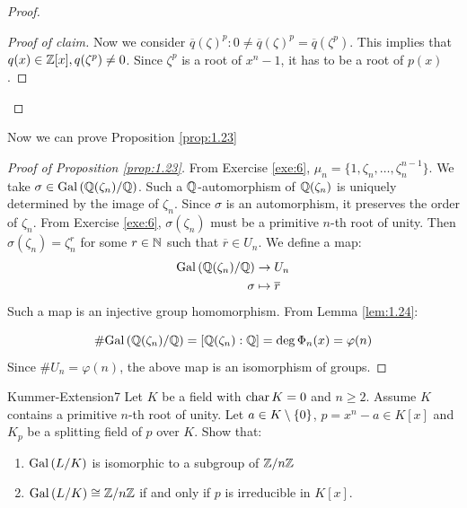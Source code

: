 \documentclass[twoside = false,	%
		headsepline,		%
		parskip = true,
		]{scrbook}						%
\begin{document}
\begin{proof}
\begin{proof}[Proof of claim]
                Now we consider $\overline{q}(\zeta)^p: 0 \neq \overline{q}(\zeta)^p = \overline{q}(\zeta^p)$. This implies that $q(x) \in \mathbb Z[x], q(\zeta^p) \neq 0$. Since $\zeta^p$ is a root of $x^n - 1$, it has to be a root of $p(x)$.
            \end{proof}
        \end{proof}
        
        Now we can prove Proposition \ref{prop:1.23}
        
        \begin{proof}[Proof of Proposition \ref{prop:1.23}]
            
            From Exercise \ref{exe:6}, $\mu_n = \{1,\zeta_n,\dots,\zeta_n^{n-1}\}$. We take $\sigma \in \mathrm{Gal}\left( \mathbb Q(\zeta_n)/\mathbb Q\right)$. Such a $\mathbb Q$-automorphism of $\mathbb Q(\zeta_n)$ is uniquely determined by the image of $\zeta_n$. Since $\sigma$ is an automorphism, it preserves the order of $\zeta_n$. From Exercise \ref{exe:6}, $\sigma(\zeta_n)$ must be a primitive $n$-th root of unity. Then $\sigma(\zeta_n) = \zeta_n^r$ for some $r \in \mathbb N$ such that $\overline{r} \in U_n$. We define a map:
            \begin{equation*}
                \begin{split}
                    \mathrm{Gal}\left( \mathbb Q(\zeta_n)/\mathbb Q\right) &\rightarrow U_n \\
                    \sigma &\mapsto \overline{r}
                \end{split}
            \end{equation*}
            Such a map is an injective group homomorphism. From Lemma \ref{lem:1.24}:
            
            \begin{equation*}
                \#\mathrm{Gal}\left( \mathbb Q(\zeta_n)/\mathbb Q\right) = [\mathbb Q(\zeta_n) : \mathbb Q] = \deg \Phi_n(x) = \varphi(n)
            \end{equation*}
            Since $\#U_n = \varphi(n)$, the above map is an isomorphism of groups.
        \end{proof}
        \begin{exercise}{Kummer-Extension}{7}
            Let $K$ be a field with $\mathrm{char} \, K = 0$ and $n\geq 2$. Assume $K$ contains a primitive $n$-th root of unity. Let $a\in K\setminus\left\{ 0\right\}$, $p=x^n-a\in K[x]$ and $K_p$ be a splitting field of $p$ over $K$. Show that:
            \begin{enumerate}
                \item $\mathrm{Gal}\left( L/K\right)$ is isomorphic to a subgroup of $\mathbb Z/n\mathbb Z$
                \item $\mathrm{Gal}\left( L/K\right)\cong \mathbb Z/n\mathbb Z$ if and only if $p$ is irreducible in $K[x]$.
            \end{enumerate}
        \end{exercise}
\end{document}
